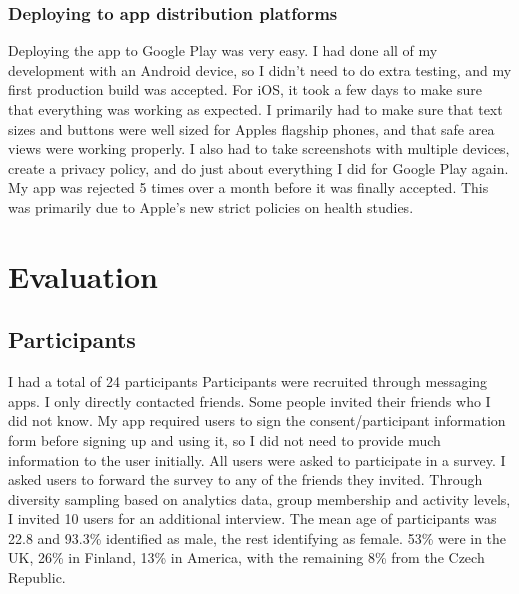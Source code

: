 \documentclass{l4proj}
\begin{document}
\subsection{Deploying to app distribution platforms}
Deploying the app to Google Play was very easy. I had done all of my development with an Android device, so I didn't need to do extra testing, and my first production build was accepted. For iOS, it took a few days to make sure that everything was working as expected. I primarily had to make sure that text sizes and buttons were well sized for Apples flagship phones, and that safe area views were working properly. I also had to take screenshots with multiple devices, create a privacy policy, and do just about everything I did for Google Play again. My app was rejected 5 times over a month before it was finally accepted. This was primarily due to Apple's new strict policies on health studies.

\chapter{Evaluation}

\section{Participants}
I had a total of 24 participants Participants were recruited through messaging apps. I only directly contacted friends. Some people invited their friends who I did not know. My app required users to sign the consent/participant information form before signing up and using it, so I did not need to provide much information to the user initially. All users were asked to participate in a survey. I asked users to forward the survey to any of the friends they invited. Through diversity sampling based on analytics data, group membership and activity levels, I invited 10 users for an additional interview. The mean age of participants was 22.8 and 93.3\% identified as male, the rest identifying as female. 53\% were in the UK, 26\% in Finland, 13\% in America, with the remaining 8\% from the Czech Republic. 
\end{document}

